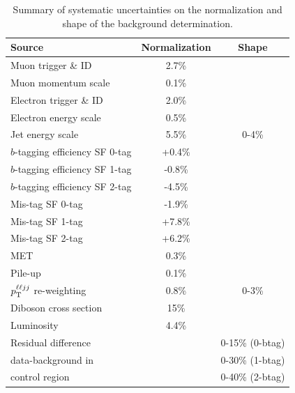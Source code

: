 \begin{table}[htb]
\caption{
Summary of systematic uncertainties on the normalization and shape of the background determination.
}
\label{table-syst-bg}
\begin{center}
\small
\begin{tabular}{|l|c|c|}
\hline
Source                           &   Normalization   &   Shape  \\ \hline \hline
Muon trigger \& ID               &  2.7\%            &          \\
Muon momentum scale              &  0.1\%            &          \\
Electron trigger \& ID           &  2.0\%            &          \\
Electron energy scale            &  0.5\%            &          \\
Jet energy scale                 &  5.5\%            &   0-4\%  \\ 
\hline
$b$-tagging efficiency SF 0-tag  & +0.4\%            &          \\ 
$b$-tagging efficiency SF 1-tag  & -0.8\%            &          \\ 
$b$-tagging efficiency SF 2-tag  & -4.5\%            &          \\ 
\hline
Mis-tag SF 0-tag                  & -1.9\%            &          \\ 
Mis-tag SF 1-tag                  & +7.8\%            &          \\ 
Mis-tag SF 2-tag                  & +6.2\%            &          \\ 
\hline
MET                              &  0.3\%            &          \\ 
Pile-up                          &  0.1\%            &          \\
$p_{\mathrm{T}}^{\ell\ell jj}$ re-weighting    &  0.8\%            &   0-3\%  \\
Diboson cross section            &  15\%             &          \\
Luminosity                       &  4.4\%           &          \\ \hline 
Residual difference              &                   &  0-15\% (0-btag) \\
data-background in               &                   &  0-30\% (1-btag) \\
control region                   &                   &  0-40\% (2-btag) \\
\hline 
\end{tabular} 
\end{center} 
\end{table} 


